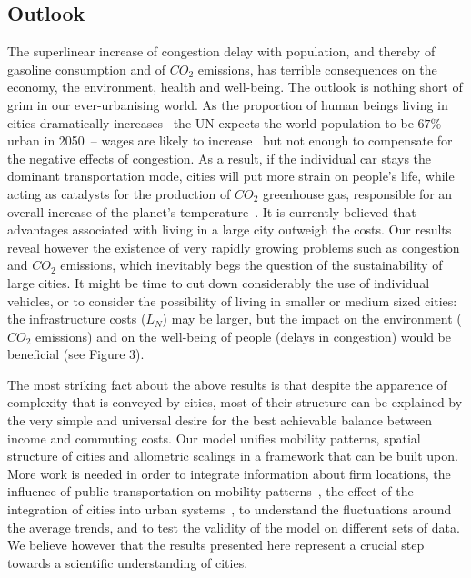 \subsection{Outlook}

The superlinear increase of congestion delay with population, and thereby of gasoline consumption and of $CO_2$ emissions, has terrible consequences on the economy, the environment, health and well-being. The outlook is nothing short of grim in our ever-urbanising world. As the proportion of human beings living in cities dramatically increases --the UN expects the world population to be $67\%$ urban in 2050~\cite{UN:2011}-- wages are likely to increase~\cite{Bettencourt:2007} but not enough to compensate for the negative effects of congestion. As a result, if the individual car stays the dominant transportation mode, cities will put more strain on people's life, while acting as catalysts for the production of $CO_2$ greenhouse gas, responsible for an overall increase of the planet's temperature~\cite{Oreskes:2004}. It is currently believed that advantages associated with living in a large city outweigh the costs. Our results reveal however the existence of very rapidly growing problems such as congestion and $CO_2$ emissions, which inevitably begs the question of the sustainability of large cities. It might be time to cut down considerably the use of individual vehicles, or to consider the possibility of living in smaller or medium sized cities: the infrastructure costs ($L_N$) may be larger, but the impact on the environment ($CO_2$ emissions) and on the well-being of people (delays in congestion) would be beneficial (see Figure 3).

The most striking fact about the above results is that despite the apparence of complexity that is conveyed by cities, most of their structure can be explained by the very simple and universal desire for the best achievable balance between income and commuting costs. Our model unifies mobility patterns, spatial structure of cities and allometric scalings in a framework that can be built upon. More work is needed in order to integrate information about firm locations, the influence of public transportation on mobility patterns~\cite{Roth:2011}, the effect of the integration of cities into urban systems~\cite{Rozenblat:2007}, to understand the fluctuations around the average trends, and to test the validity of the model on different sets of data. We believe however that the results presented here represent a crucial step towards a scientific understanding of cities.
